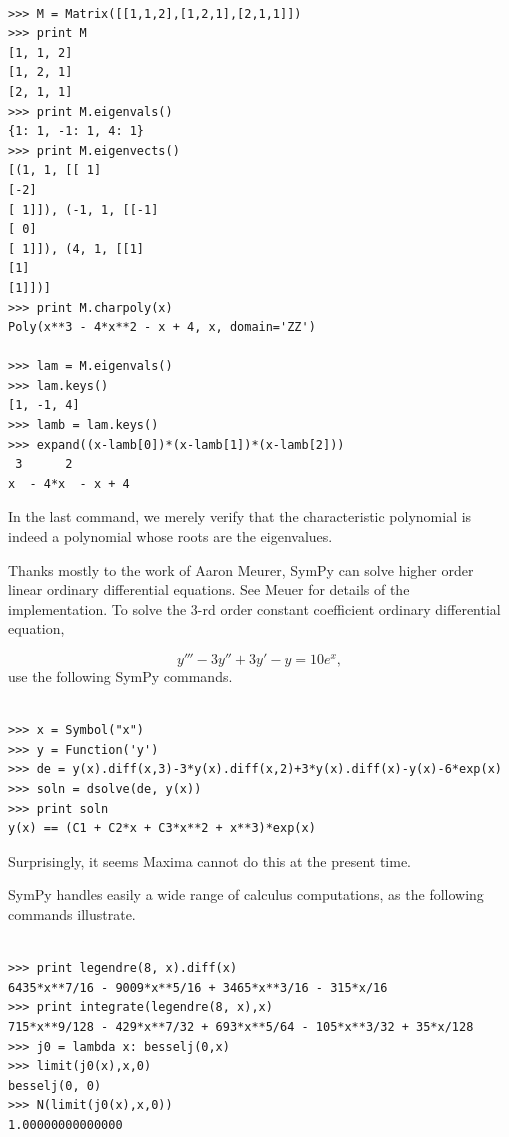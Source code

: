 \documentclass[12pt]{article}
\def\AM{Aaron Meurer}
\begin{document}
\begin{Verbatim}[fontsize=\scriptsize,fontfamily=courier,fontshape=tt,frame=single,label=SymPy]

>>> M = Matrix([[1,1,2],[1,2,1],[2,1,1]])
>>> print M
[1, 1, 2]
[1, 2, 1]
[2, 1, 1]
>>> print M.eigenvals()
{1: 1, -1: 1, 4: 1}
>>> print M.eigenvects()
[(1, 1, [[ 1]
[-2]
[ 1]]), (-1, 1, [[-1]
[ 0]
[ 1]]), (4, 1, [[1]
[1]
[1]])]
>>> print M.charpoly(x)
Poly(x**3 - 4*x**2 - x + 4, x, domain='ZZ')

>>> lam = M.eigenvals()
>>> lam.keys()
[1, -1, 4]
>>> lamb = lam.keys()
>>> expand((x-lamb[0])*(x-lamb[1])*(x-lamb[2]))
 3      2
x  - 4*x  - x + 4

\end{Verbatim}

\noindent
In the last command, we merely verify that the characteristic
polynomial is indeed a polynomial whose roots are the eigenvalues.

Thanks mostly to the work of \AM,
SymPy can solve higher order linear ordinary differential equations.
See Meuer \cite{M} for details of the implementation.
To solve the $3$-rd order constant coefficient ordinary differential
equation,

\[
y'''-3y''+3y'-y=10e^x,
\]
use the following SymPy commands.

\begin{Verbatim}[fontsize=\scriptsize,fontfamily=courier,fontshape=tt,frame=single,label=SymPy]

>>> x = Symbol("x")
>>> y = Function('y')
>>> de = y(x).diff(x,3)-3*y(x).diff(x,2)+3*y(x).diff(x)-y(x)-6*exp(x)
>>> soln = dsolve(de, y(x))
>>> print soln
y(x) == (C1 + C2*x + C3*x**2 + x**3)*exp(x)

\end{Verbatim}

\noindent
Surprisingly, it seems Maxima cannot do this at the present time.

SymPy handles easily a wide range of calculus computations, as the following
commands illustrate.

\begin{Verbatim}[fontsize=\scriptsize,fontfamily=courier,fontshape=tt,frame=single,label=SymPy]

>>> print legendre(8, x).diff(x)
6435*x**7/16 - 9009*x**5/16 + 3465*x**3/16 - 315*x/16
>>> print integrate(legendre(8, x),x)
715*x**9/128 - 429*x**7/32 + 693*x**5/64 - 105*x**3/32 + 35*x/128
>>> j0 = lambda x: besselj(0,x)
>>> limit(j0(x),x,0)
besselj(0, 0)
>>> N(limit(j0(x),x,0))
1.00000000000000

\end{Verbatim}
\end{document}
